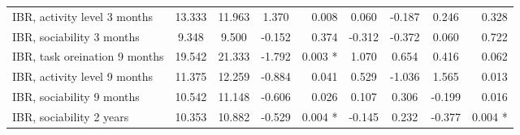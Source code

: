 \begin{tabular}{l c c c r c c c r}
IBR, activity level 3 months & 13.333 & 11.963 & 1.370 & 0.008 & 0.060 & -0.187 & 0.246 & 0.328 \\
IBR, sociability 3 months & 9.348 & 9.500 & -0.152 & 0.374 & -0.312 & -0.372 & 0.060 & 0.722 \\
IBR, task oreination 9 months & 19.542 & 21.333 & -1.792 & 0.003 * & 1.070 & 0.654 & 0.416 & 0.062 \\
IBR, activity level 9 months & 11.375 & 12.259 & -0.884 & 0.041 & 0.529 & -1.036 & 1.565 & 0.013 \\
IBR, sociability 9 months & 10.542 & 11.148 & -0.606 & 0.026 & 0.107 & 0.306 & -0.199 & 0.016 \\
IBR, sociability 2 years & 10.353 & 10.882 & -0.529 & 0.004 * & -0.145 & 0.232 & -0.377 & 0.004 * \\
\bottomrule
\end{tabular}
